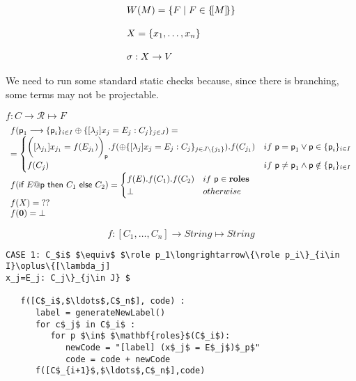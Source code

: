 \begin{displaymath}
  \begin{array}{lll}
    W(M) = \{F \mid F\in\{\![M]\!\}\}
    \\\\
    X = \{x_1,\ldots,x_n\}
    \\\\
    \sigma : X \rightarrow V
  \end{array}
\end{displaymath}



 We need to run some standard
static checks because, since there is branching, some terms may not be
projectable.


$f: C\rightarrow \mathcal R\mapsto F$
\[
\begin{array}{l}
f(\textsf{p}_1\longrightarrow\{\textsf{p}_i\}_{i\in I}\oplus\{[\lambda_j]
x_j=E_j: C_j\}_{j\in J}) = \\
= \begin{cases}
\bigg( [\lambda_{j_1}] x_{j_1} = f(E_{j_1}) \bigg)_{\textsf{p}}. f(\oplus\{[\lambda_j]
x_j=E_j: C_j\}_{j\in J\setminus\{{j_1}\}}). f(C_{j_1}) &if \ \textsf{p} = \textsf{p}_1 \lor \textsf{p} \in \textsf{\{}\textsf{p}_i\}_{i \in I} \\
f(C_j) & if \ \textsf{p} \neq \textsf{p}_1 \land \textsf{p} \notin \{\textsf{p}_i\}_{i\in I}
\end{cases} 
\\
f(\textsf{if } E@\textsf{p} \textsf{ then } C_1 \textsf{ else } C_2) = \begin{cases}
f(E) . f(C_1) . f(C_2) & if\ \textsf{p}\in \mathbf{roles}\\
\bot & otherwise
\end{cases} 
\\
f(X) = \; ??
\\
f(\mathbf{0}) = \bot
\end{array}
\]


\[
f: [C_1,\ldots,C_n] \rightarrow String \mapsto String
\]


\begin{lstlisting}[mathescape=true,backgroundcolor={}]
CASE 1: C_$i$ $\equiv$ $\role p_1\longrightarrow\{\role p_i\}_{i\in I}\oplus\{[\lambda_j]
x_j=E_j: C_j\}_{j\in J} $

   f([C$_i$,$\ldots$,C$_n$], code) :
      label = generateNewLabel()
      for c$_j$ in C$_i$ :
         for p $\in$ $\mathbf{roles}$(C$_i$):
            newCode = "[label] (x$_j$ = E$_j$)$_p$"
            code = code + newCode
      f([C$_{i+1}$,$\ldots$,C$_n$],code)
      
\end{lstlisting}    



